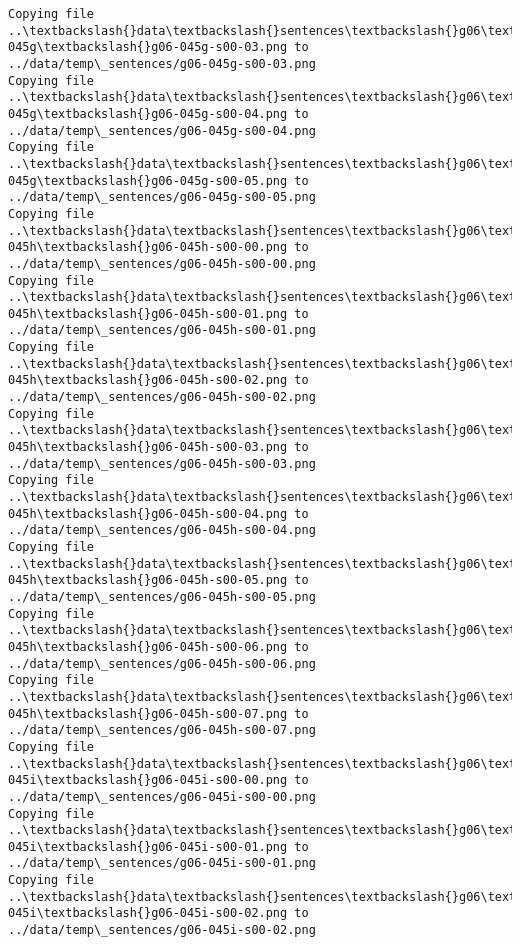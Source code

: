 \documentclass[11pt]{article}
\begin{document}
\begin{Verbatim}[commandchars=\\\{\}]
Copying file ..\textbackslash{}data\textbackslash{}sentences\textbackslash{}g06\textbackslash{}g06-045g\textbackslash{}g06-045g-s00-03.png to
../data/temp\_sentences/g06-045g-s00-03.png
Copying file ..\textbackslash{}data\textbackslash{}sentences\textbackslash{}g06\textbackslash{}g06-045g\textbackslash{}g06-045g-s00-04.png to
../data/temp\_sentences/g06-045g-s00-04.png
Copying file ..\textbackslash{}data\textbackslash{}sentences\textbackslash{}g06\textbackslash{}g06-045g\textbackslash{}g06-045g-s00-05.png to
../data/temp\_sentences/g06-045g-s00-05.png
Copying file ..\textbackslash{}data\textbackslash{}sentences\textbackslash{}g06\textbackslash{}g06-045h\textbackslash{}g06-045h-s00-00.png to
../data/temp\_sentences/g06-045h-s00-00.png
Copying file ..\textbackslash{}data\textbackslash{}sentences\textbackslash{}g06\textbackslash{}g06-045h\textbackslash{}g06-045h-s00-01.png to
../data/temp\_sentences/g06-045h-s00-01.png
Copying file ..\textbackslash{}data\textbackslash{}sentences\textbackslash{}g06\textbackslash{}g06-045h\textbackslash{}g06-045h-s00-02.png to
../data/temp\_sentences/g06-045h-s00-02.png
Copying file ..\textbackslash{}data\textbackslash{}sentences\textbackslash{}g06\textbackslash{}g06-045h\textbackslash{}g06-045h-s00-03.png to
../data/temp\_sentences/g06-045h-s00-03.png
Copying file ..\textbackslash{}data\textbackslash{}sentences\textbackslash{}g06\textbackslash{}g06-045h\textbackslash{}g06-045h-s00-04.png to
../data/temp\_sentences/g06-045h-s00-04.png
Copying file ..\textbackslash{}data\textbackslash{}sentences\textbackslash{}g06\textbackslash{}g06-045h\textbackslash{}g06-045h-s00-05.png to
../data/temp\_sentences/g06-045h-s00-05.png
Copying file ..\textbackslash{}data\textbackslash{}sentences\textbackslash{}g06\textbackslash{}g06-045h\textbackslash{}g06-045h-s00-06.png to
../data/temp\_sentences/g06-045h-s00-06.png
Copying file ..\textbackslash{}data\textbackslash{}sentences\textbackslash{}g06\textbackslash{}g06-045h\textbackslash{}g06-045h-s00-07.png to
../data/temp\_sentences/g06-045h-s00-07.png
Copying file ..\textbackslash{}data\textbackslash{}sentences\textbackslash{}g06\textbackslash{}g06-045i\textbackslash{}g06-045i-s00-00.png to
../data/temp\_sentences/g06-045i-s00-00.png
Copying file ..\textbackslash{}data\textbackslash{}sentences\textbackslash{}g06\textbackslash{}g06-045i\textbackslash{}g06-045i-s00-01.png to
../data/temp\_sentences/g06-045i-s00-01.png
Copying file ..\textbackslash{}data\textbackslash{}sentences\textbackslash{}g06\textbackslash{}g06-045i\textbackslash{}g06-045i-s00-02.png to
../data/temp\_sentences/g06-045i-s00-02.png

\end{Verbatim}
\end{document}
